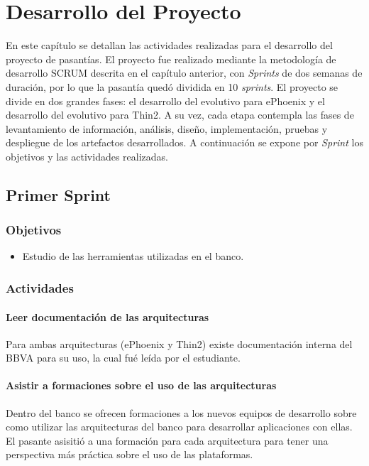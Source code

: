 \chapter{Desarrollo del Proyecto}
\label{capitulo4}

En este capítulo se detallan las actividades realizadas para el
desarrollo del proyecto de pasantías. El proyecto fue realizado
mediante la metodología de desarrollo SCRUM descrita en el capítulo
anterior, con \emph{Sprints} de dos semanas de duración, por lo
que la pasantía quedó dividida en 10 \emph{sprints}. El proyecto
se divide en dos grandes fases: el desarrollo del evolutivo para ePhoenix
y el desarrollo del evolutivo para Thin2. A su vez, cada etapa contempla
las fases de levantamiento de información, análisis, diseño, implementación,
pruebas y despliegue de los artefactos desarrollados. A continuación se
expone por \emph{Sprint} los objetivos y las actividades realizadas.

\section{Primer Sprint}

\subsection{Objetivos}
\begin{itemize}
\item Estudio de las herramientas utilizadas en el banco.
\end{itemize}
\subsection{Actividades}
\subsubsection{Leer documentación de las arquitecturas}
Para ambas arquitecturas (ePhoenix y Thin2) existe documentación interna del BBVA
para su uso, la cual fué leída por el estudiante.
\subsubsection{Asistir a formaciones sobre el uso de las arquitecturas}
Dentro del banco se ofrecen formaciones a los nuevos equipos de desarrollo
sobre como utilizar las arquitecturas del banco para desarrollar aplicaciones con
ellas. El pasante asisitió a una formación para cada arquitectura para tener
una perspectiva más práctica sobre el uso de las plataformas.

